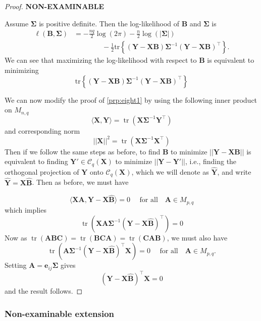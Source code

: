 \documentclass[
]{book}
\theoremstyle{definition}
\theoremstyle{definition}
\theoremstyle{definition}
\theoremstyle{definition}
\theoremstyle{remark}
\begin{document}
\begin{proof}
\textbf{NON-EXAMINABLE}

Assume \(\boldsymbol{\Sigma}\) is positive definite. Then
the log-likelihood of \(\mathbf B\) and \(\boldsymbol{\Sigma}\) is
\begin{align}
\ell(\mathbf B, \boldsymbol{\Sigma})&=-\frac{nq}{2}\log(2\pi) -\frac{n}{2}\log(\vert \boldsymbol{\Sigma}\vert) \nonumber \\
& \qquad \qquad -\frac{1}{2}\text{tr}\left \{
(\mathbf Y-\mathbf X\mathbf B) \boldsymbol{\Sigma}^{-1} (\mathbf Y- \mathbf X\mathbf B)^\top\right \}.
\label{eq:MVNlik}
\end{align}
We can see that maximizing the log-likelihood with respect to \(\mathbf B\) is equivalent to minimizing
\[\text{tr}\left \{
(\mathbf Y-\mathbf X\mathbf B) \boldsymbol{\Sigma}^{-1} (\mathbf Y- \mathbf X\mathbf B)^\top\right \}\]

We can now modify the proof of \ref{prp:eight1} by using the following inner product on \(M_{n,q}\)
\[\langle \mathbf X, \mathbf Y\rangle = \operatorname{tr}(\mathbf X\boldsymbol{\Sigma}^{-1}\mathbf Y^\top)\]
and corresponding norm
\[||\mathbf X||^2= \operatorname{tr}(\mathbf X\boldsymbol{\Sigma}^{-1}\mathbf X^\top)\]
Then if we follow the same steps as before, to find \(\mathbf B\) to minimize \(||\mathbf Y-\mathbf X\mathbf B||\) is equivalent to finding \({\mathbf Y}' \in \mathcal{C}_q(\mathbf X)\) to minimize \(||\mathbf Y-{\mathbf Y}'||\), i.e., finding the orthogonal projection of \(\mathbf Y\) onto \(\mathcal{C}_q(\mathbf X)\), which we will denote as \(\hat{\mathbf Y}\), and write \(\hat{\mathbf Y}=\mathbf X\hat{\mathbf B}\). Then as before, we must have

\[\langle \mathbf X\mathbf A, \mathbf Y-\mathbf X\hat{\mathbf B}\rangle=0 \quad \mbox{ for all} \quad \mathbf A\in M_{p,q}\]
which implies
\[\operatorname{tr}(\mathbf X\mathbf A\boldsymbol{\Sigma}^{-1} (\mathbf Y-\mathbf X\hat{\mathbf B})^\top )=0\]
Now as \(\operatorname{tr}(\mathbf A\mathbf B\mathbf C)=\operatorname{tr}(\mathbf B\mathbf C\mathbf A)=\operatorname{tr}(\mathbf C\mathbf A\mathbf B)\), we must also have
\[\operatorname{tr}(\mathbf A\boldsymbol{\Sigma}^{-1} (\mathbf Y-\mathbf X\hat{\mathbf B})^\top \mathbf X)=0\quad \mbox{ for all} \quad \mathbf A\in M_{p,q}.\]
Setting \(\mathbf A= \mathbf e_{ij}\boldsymbol{\Sigma}\) gives
\[(\mathbf Y-\mathbf X\hat{\mathbf B})^\top \mathbf X=0\]
and the result follows.
\end{proof}

\hypertarget{non-examinable-extension}{%
\subsubsection*{Non-examinable extension}\label{non-examinable-extension}}
\end{document}
